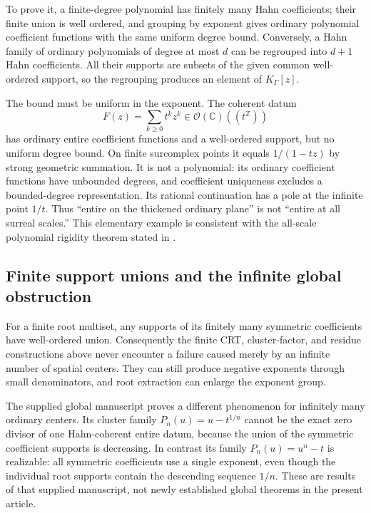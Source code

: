 \documentclass[11pt,letterpaper]{article}
\numberwithin{equation}{section}
\theoremstyle{definition}
\theoremstyle{remark}\newtheorem{remark}[theorem]{Remark}
\newcommand{\C}{\mathbb C}
\newcommand{\Z}{\mathbb Z}
\newcommand{\OO}{\mathcal O}
\begin{document}
To prove it, a finite-degree polynomial has finitely many Hahn
coefficients; their finite union is well ordered, and grouping by
exponent gives ordinary polynomial coefficient functions with the same
uniform degree bound. Conversely, a Hahn family of ordinary polynomials
of degree at most $d$ can be regrouped into $d+1$ Hahn coefficients.
All their supports are subsets of the given common well-ordered support,
so the regrouping produces an element of $K_\Gamma[z]$.

The bound must be uniform in the exponent. The coherent datum
\begin{equation}\label{eq:geometricentire}
 F(z)=\sum_{k\ge0}t^kz^k\in\OO(\C)((t^\Z))
\end{equation}
has ordinary entire coefficient functions and a well-ordered support,
but no uniform degree bound. On finite surcomplex points it equals
$1/(1-tz)$ by strong geometric summation. It is not a polynomial:
its ordinary coefficient functions have unbounded degrees, and
coefficient uniqueness excludes a bounded-degree representation.
Its rational continuation has a pole at the infinite point $1/t$.
Thus ``entire on the thickened ordinary plane'' is not ``entire at
all surreal scales.'' This elementary example is consistent with the
all-scale polynomial rigidity theorem stated in \cite{SourceAnalysis}.

\subsection{Finite support unions and the infinite global obstruction}
For a finite root multiset, any supports of its finitely many symmetric
coefficients have well-ordered union. Consequently the finite CRT,
cluster-factor, and residue constructions above never encounter a
failure caused merely by an infinite number of spatial centers.
They can still produce negative exponents through small denominators,
and root extraction can enlarge the exponent group.

The supplied global manuscript \cite{SourceGlobal} proves a different
phenomenon for infinitely many ordinary centers. Its cluster family
$P_n(u)=u-t^{1/n}$ cannot be the exact zero divisor of one Hahn-coherent
entire datum, because the union of the symmetric coefficient supports
is decreasing. In contrast its family $P_n(u)=u^n-t$ is realizable:
all symmetric coefficients use a single exponent, even though the
individual root supports contain the descending sequence $1/n$.
These are results of that supplied manuscript, not newly established
global theorems in the present article.
\end{document}

